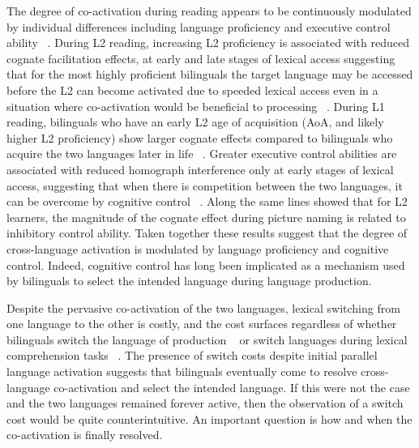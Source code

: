 The degree of co-activation during reading appears to be continuously modulated by individual differences including language proficiency and executive control ability ~\citep{Linck2009, Pivneva2014, Titone2011}. During L2 reading, increasing L2 proficiency is associated with reduced cognate facilitation effects, at early and late stages of lexical access suggesting that for the most highly proficient bilinguals the target language may be accessed before the L2 can become activated due to speeded lexical access even in a situation where co-activation would be beneficial to processing ~\citep[in the case of cognates, which share complete overlap between the two languages;][]{Pivneva2014}. During L1 reading, bilinguals who have an early L2 age of acquisition (AoA, and likely higher L2 proficiency) show larger cognate effects compared to bilinguals who acquire the two languages later in life ~\citep{Titone2011}. Greater executive control abilities are associated with reduced homograph interference only at early stages of lexical access, suggesting that when there is competition between the two languages, it can be overcome by cognitive control ~\citep{Pivneva2014}. Along the same lines  \citet{Linck2009} showed that for L2 learners, the magnitude of the cognate effect during picture naming is related to inhibitory control ability. Taken together these results suggest that the degree of cross-language activation is modulated by language proficiency and cognitive control. Indeed, cognitive control has long been implicated as a mechanism used by bilinguals to select the intended language during language production.

Despite the pervasive co-activation of the two languages, lexical switching from one language to the other is costly, and the cost surfaces regardless of whether bilinguals switch the language of production ~\citep{Macnamara1968, Meuter1999, Costa2004, Costa2006, Gollan2009} or switch languages during lexical comprehension tasks ~\citep[e.g.,][]{Grainger1987, Thomas2000, VonStudnitz2002}. The presence of switch costs despite initial parallel language activation suggests that bilinguals eventually come to resolve cross-language co-activation and select the intended language. If this were not the case and the two languages remained forever active, then the observation of a switch cost would be quite counterintuitive. An important question is how and when the co-activation is finally resolved.

